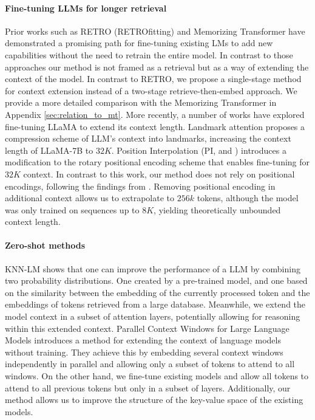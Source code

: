 \paragraph{Fine-tuning LLMs for longer {retrieval}} Prior works such as RETRO \citep{borgeaud2022retro} (RETROfitting) and Memorizing Transformer \citep{wu2022memorizing} have demonstrated a promising path for fine-tuning existing LMs to add new capabilities without the need to retrain the entire model. {In contrast to those approaches our method is not framed as a retrieval but as a way of extending the context of the model. In contrast to RETRO, we propose a single-stage method for context extension instead of a two-stage retrieve-then-embed approach. We provide a more detailed comparison with the Memorizing Transformer in Appendix \ref{sec:relation_to_mt}.} More recently, a number of works have explored fine-tuning LLaMA to extend its context length. Landmark attention \citep{mohtashami2023landmark} proposes a compression scheme of LLM's context into landmarks, increasing the context length of LLaMA-7B to $32K$. Position Interpolation (PI, \citep{chen2023extending} and \citep{superhot}) introduces a modification to the rotary positional encoding scheme that enables fine-tuning for $32K$ context. In contrast to this work, our method does not rely on positional encodings, following the findings from \citep{haviv2022transformer}. Removing positional encoding in additional context allows us to extrapolate to $256k$ tokens, although the model was only trained on sequences up to $8K$, yielding theoretically unbounded context length.

\paragraph{Zero-shot methods} {KNN-LM \citep{khandelwal2019knnlm} shows that one can improve the performance of a LLM by combining two probability distributions. One created by a pre-trained model, and one based on the similarity between the embedding of the currently processed token and the embeddings of tokens retrieved from a large database. Meanwhile, we extend the model context in a subset of attention layers, potentially allowing for reasoning within this extended context.} {Parallel Context Windows for Large Language Models \citep{ratner2023parallel} introduces a method for extending the context of language models without training. They achieve this by embedding several context windows independently in parallel and allowing only a subset of tokens to attend to all windows. On the other hand, we fine-tune existing models and allow all tokens to attend to all previous tokens but only in a subset of layers. Additionally, our method allows us to improve the structure of the key-value space of the existing models.}

